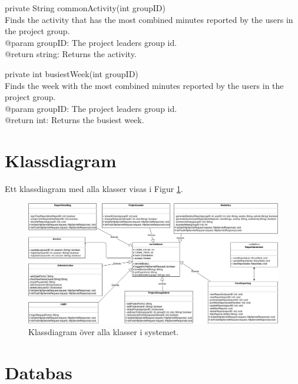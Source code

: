 \documentclass[a4paper]{article}
\begin{document}
\vspace{5mm}
\begin{hangparas}{1.5em}{1}
private String commonActivity(int groupID)\\
Finds the activity that has the most combined minutes reported by the users in the project group.\\
@param groupID: The project leaders group id.\\
@return string: Returns the activity.
\end{hangparas}

\vspace{5mm}
\begin{hangparas}{1.5em}{1}
private int busiestWeek(int groupID)\\
Finds the week with the most combined minutes reported by the users in the project group.\\
@param groupID: The project leaders group id.\\
@return int: Returns the busiest week.\\
\end{hangparas}

\section{Klassdiagram}
Ett klassdiagram med alla klasser visas i Figur \ref{umldiagram}.

\begin{figure}[h!]
\centering
\includegraphics[width=160mm]{UML.jpg}
\caption{Klassdiagram över alla klasser i systemet. \label{umldiagram}}
\end{figure}



\section{Databas}
\end{document}
